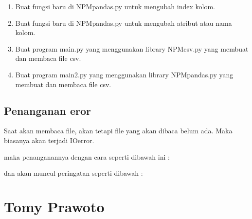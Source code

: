 \begin{enumerate}
	\item Buat fungsi baru di NPMpandas.py untuk mengubah index kolom.
	
	
	
	\item Buat fungsi baru di NPMpandas.py untuk mengubah atribut atau nama kolom.
	
	
	
	\item Buat program main.py yang menggunakan library NPMcsv.py yang membuat dan membaca file csv.
	
	
	
	\item Buat program main2.py yang menggunakan library NPMpandas.py yang membuat dan membaca file csv.
	
		
\end{enumerate}

\subsection{Penanganan eror}
Saat akan membaca file, akan tetapi file yang akan dibaca belum ada. Maka biasanya akan terjadi IOerror.

maka penanganannya dengan cara seperti dibawah ini :

dan akan muncul peringatan seperti dibawah :


\section{Tomy Prawoto}
